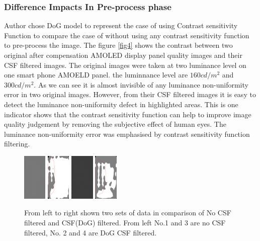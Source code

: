 \documentclass{article}
\begin{document}
\subsubsection{Difference Impacts In Pre-process phase}
Author chose DoG model to represent the case of using Contrast sensitivity Function to compare the case of without using any contrast sensitivity function to pre-process the image.
The figure \ref{fig4} shows the contrast between two original after compensation AMOLED display panel quality images and their CSF filtered images. The original images were taken at two luminance level on one smart phone AMOELD panel. the luminnance level are $160 cd/m^2$ and $300 cd/m^2$. As we can see it is almost invisible of any luminance non-uniformity error in two original images. However, from their CSF filtered images it is easy to detect the luminance non-uniformity defect in highlighted areas. This is one indicator shows that the contrast sensitivity function can help to improve image quality judgement by removing the subjective effect of human eyes. The luminance non-uniformity error was emphasised by contrast sensitivity function filtering.

\begin{figure}[h]
    \centering
    \includegraphics[width=0.1\textwidth]{images/A1_G_160_I3_PsdLum.csv.png}\hfill
    \includegraphics[width=0.1\textwidth]{images/DoG_csfed_A1_G_160_I3_PsdLum.csv.png}\hfill
    \includegraphics[width=0.1\textwidth]{images/A1_G_300_I3_PsdLum.csv.png}\hfill
    \includegraphics[width=0.1\textwidth]{images/DoG_csfed_A1_G_300_I3_PsdLum.csv.png}
    \caption{ From left to right shown two sets of data in comparison of No CSF filtered and CSF(DoG) filtered. From left No.1 and 3 are no CSF filtered, No. 2 and 4 are DoG CSF filtered. }
    \label{fig3}
\end{figure}
\end{document}
